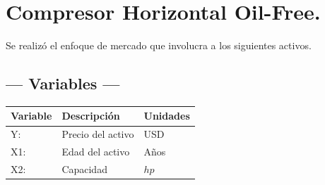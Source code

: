 
\section{Compresor Horizontal Oil-Free.} %
Se realizó el enfoque de mercado que involucra a los siguientes activos.

\subsection{\centering --- Variables ---} %
\begin{center}
  \begin{tabular}{|l|l|l|}
    \hline 
    Variable & Descripción   & Unidades\\ \hline 
    Y:  & Precio del activo  & USD \\ \hline 
    X1: & Edad del activo    & Años \\ \hline 
		X2: & Capacidad  & \(hp\) \\ \hline 
  \end{tabular}
\end{center} 

